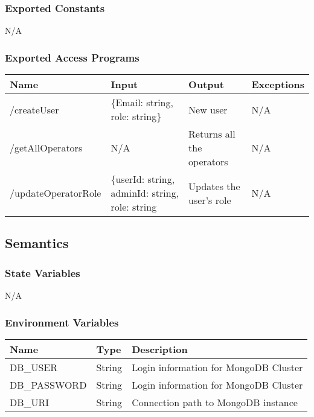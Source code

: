 \documentclass[12pt, titlepage]{article}
\begin{document}
\subsubsection{Exported Constants}
N/A

\subsubsection{Exported Access Programs}


\begin{center}
\begin{tabular}{p{4cm} p{4cm} p{4cm} p{2cm}}
\hline
\textbf{Name} & \textbf{Input} & \textbf{Output} & \textbf{Exceptions}\\
\hline
/createUser& \{Email: string, role: string\}& New user& N/A\\
\hline
/getAllOperators& N/A&  Returns all the operators& N/A\\
\hline
/updateOperatorRole& \{userId: string, adminId: string, role: string& Updates the user’s role& N/A\\

\end{tabular}

\end{center}

\subsection{Semantics}

\subsubsection{State Variables}

N/A

\subsubsection{Environment Variables}

\begin{center}
\begin{tabular}{|p{4cm} |p{4cm} |p{4cm}|}
\hline
\textbf{Name} & \textbf{Type} & \textbf{Description} \\
\hline
DB\_USER & String& Login information for MongoDB Cluster \\
\hline
DB\_PASSWORD & String & Login information for MongoDB Cluster \\
\hline
DB\_URI & String & Connection path to MongoDB instance \\
\hline
\end{tabular}
\end{center}
\end{document}
